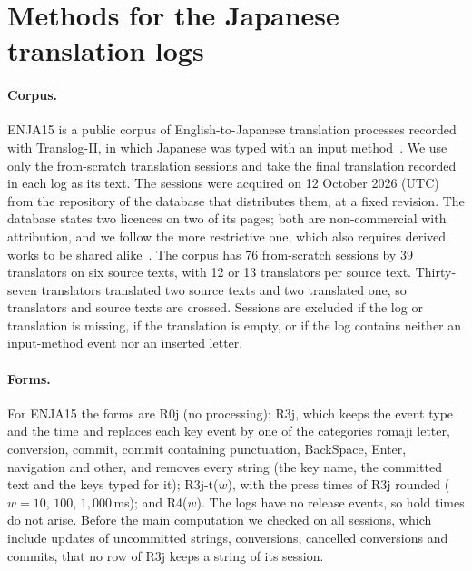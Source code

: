 \section{Methods for the Japanese translation logs}
\label{app:enja}


\paragraph{Corpus.}
ENJA15 is a public corpus of English-to-Japanese translation processes recorded with Translog-II, in which Japanese was
typed with an input method~\cite{carl2016lrec,zou2026translog}. We use only the from-scratch translation sessions and
take the final translation recorded in each log as its text. The sessions were acquired on 12 October 2026 (UTC) from
the repository of the database that distributes them, at a fixed revision. The database states two licences on two of
its pages; both are non-commercial with attribution, and we follow the more restrictive one, which also requires
derived works to be shared alike~\cite{crittlicense}. The corpus has 76 from-scratch sessions by 39 translators on six
source texts, with 12 or 13 translators per source text. Thirty-seven translators translated two source texts and two
translated one, so translators and source texts are crossed. Sessions are excluded if the log or translation is missing,
if the translation is empty, or if the log contains neither an input-method event nor an inserted letter.

\paragraph{Forms.}
For ENJA15 the forms are R0j (no processing); R3j, which keeps the event type and the time and replaces each key event
by one of the categories romaji letter, conversion, commit, commit containing punctuation, BackSpace, Enter, navigation
and other, and removes every string (the key name, the committed text and the keys typed for it); R3j-t($w$), with the
press times of R3j rounded ($w = 10$, $100$, $1{,}000$\,ms); and R4($w$). The logs have no release events, so hold
times do not arise. Before the main computation we checked on all sessions, which include updates of uncommitted
strings, conversions, cancelled conversions and commits, that no row of R3j keeps a string of its session.

